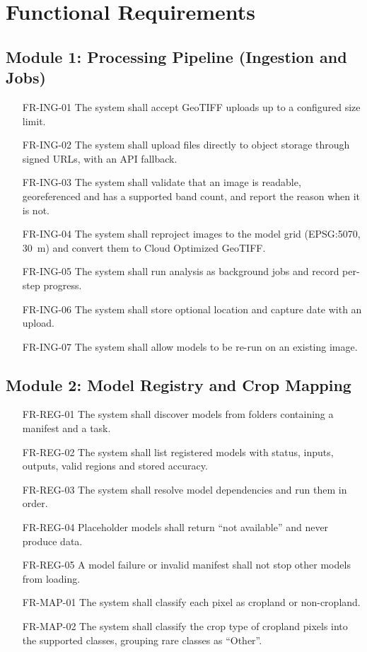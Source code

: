 \section{Functional Requirements}
\subsection{Module 1: Processing Pipeline (Ingestion and Jobs)}
\begin{itemize}[leftmargin=2.2cm]
  \item[FR-ING-01] The system shall accept GeoTIFF uploads up to a configured size limit.
  \item[FR-ING-02] The system shall upload files directly to object storage through signed URLs,
        with an API fallback.
  \item[FR-ING-03] The system shall validate that an image is readable, georeferenced and has a
        supported band count, and report the reason when it is not.
  \item[FR-ING-04] The system shall reproject images to the model grid (EPSG:5070, 30~m) and convert
        them to Cloud Optimized GeoTIFF.
  \item[FR-ING-05] The system shall run analysis as background jobs and record per-step progress.
  \item[FR-ING-06] The system shall store optional location and capture date with an upload.
  \item[FR-ING-07] The system shall allow models to be re-run on an existing image.
\end{itemize}

\subsection{Module 2: Model Registry and Crop Mapping}
\begin{itemize}[leftmargin=2.2cm]
  \item[FR-REG-01] The system shall discover models from folders containing a manifest and a task.
  \item[FR-REG-02] The system shall list registered models with status, inputs, outputs, valid regions
        and stored accuracy.
  \item[FR-REG-03] The system shall resolve model dependencies and run them in order.
  \item[FR-REG-04] Placeholder models shall return ``not available'' and never produce data.
  \item[FR-REG-05] A model failure or invalid manifest shall not stop other models from loading.
  \item[FR-MAP-01] The system shall classify each pixel as cropland or non-cropland.
  \item[FR-MAP-02] The system shall classify the crop type of cropland pixels into the supported
        classes, grouping rare classes as ``Other''.
\end{itemize}

